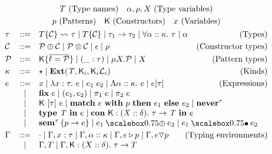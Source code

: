 \begin{gather*}
  T~\text{(Type names)}\quad \alpha,\rho,X~\text{(Type variables)} \\
  p~\text{(Patterns)}\quad \fnlab{K}~\text{(Constructors)} \quad x~\text{(Variables)} \\
  \begin{array}{lcl}
    \tau &::=& \tysem{\tydata{T}{\con}}{}{\tau} \mid \tydata{T}{\con} \mid \tyarr{\tau_1}{\tau_2} \mid \tyall{\alpha}{\kappa}{\tau} \mid \tyvar{\alpha} \qquad\hfill\text{(Types)}\\[1mm]
    \con &::=& \mathcal{P} \oplus \con \mid \mathcal{P} \otimes \con \mid \epsilon \mid \rho \qquad\hfill\text{(Constructor types)}\\[1mm]
    \mathcal{P} &::=&  \fnlab{K}\{\overline{\ell = \mathcal{P}}\} \mid (\_ : \tau) \mid \mu X. \mathcal{P} \mid X \qquad\hfill\text{(Pattern types)}\\[1mm]
    \kappa &::=& \kitype{} \mid \fnkey{Ext}(\tname, \fnlab{K}_i, \fnlab{K}_i\mathcal{L}_i) \qquad\hfill\text{(Kinds)}\\[1mm]
    e &::=& \tmvar{x} \mid \tmlam{x}{\tau}{e} \mid \tmapp{e_1}{e_2} \mid \tmtylam{\alpha}{\kappa}{e} \mid \tmtyapp{e}{\tau} \qquad\hfill\text{(Expressions)}\\
         & \mid & \tmfix{e} \mid \tmprod{e_1}{e_2} \mid \tmproj{1}{e} \mid \tmproj{2}{e} \\
         & \mid & \tmconapp{K}{\tau}{e} \mid \tmmatch{e}{p}{e_1}{e_2} \mid \tmnever{\tau} \\
         & \mid & \tmtype{T}{e} \mid \tmcondef{K}{X}{\delta}{\tau}{T}{e} \\
         & \mid & \tmsem{\tau}{p}{e} \mid \tmcomp{e_1}{e_2} \mid \tmsemapp{e_1}{e_2}\\[1mm]
    \Gamma &::=& \cdot \mid \Gamma, x : \tau \mid \Gamma, \alpha :: \kappa \mid \Gamma, \envmatch{e}{p} \mid \Gamma, \envnomatch{e}{p} \qquad\hfill\text{(Typing environments)}\\
         &\mid& \Gamma, T \mid \Gamma, \fnlab{K} : (X :: \delta).~\tau \to T
  \end{array}
\end{gather*}
